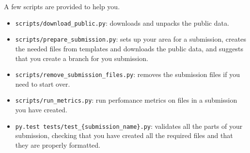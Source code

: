 A few scripts are provided to help you.

\begin{itemize}
  \item{\texttt{scripts/download\_public.py}:  downloads and unpacks
      the public data.}    
  \item{\texttt{scripts/prepare\_submission.py}:  sets up your area for
      a submission, creates the needed files from templates and
      downloads the public data, and suggests that you create a branch
      for you submission.}
  \item{\texttt{scripts/remove\_submission\_files.py}:  removes the
      submission files if you need to start over.}
  \item{\texttt{scripts/run\_metrics.py}:  run perfomance metrics on
      files in a submission you have created.}    
  \item{\texttt{py.test tests/test\_\{submission\_name\}.py}:  validates
      all the parts of your submission, checking that you have created
      all the required files and that they are properly formatted.}
\end{itemize}
      

  


      